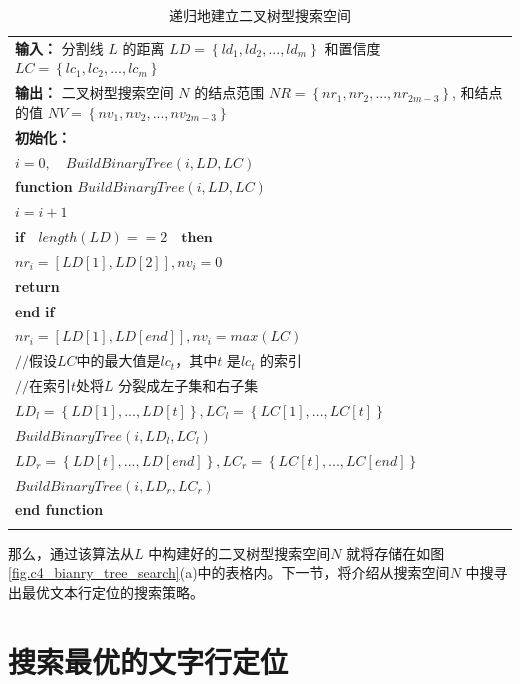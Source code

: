     \begin{table}[!h]
    \renewcommand\arraystretch{1.5}
    \centering
    \caption{递归地建立二叉树型搜索空间}
    \begin{tabular}{p{}}
    \toprule
    \textbf{输入：} 分割线 $L$ 的距离 $LD=\left\{ld_1,ld_2,...,ld_m\right\}$ 和置信度$LC=\left\{lc_1,lc_2,...,lc_m\right\}$\\
    \textbf{输出：} 二叉树型搜索空间 $N$ 的结点范围 $NR=\left\{nr_1,nr_2,...,nr_{2m-3}\right\}$, 和结点的值 $NV=\left\{nv_1,nv_2,...,nv_{2m-3}\right\}$\\
    \midrule
    \textbf{初始化：}\\
    \qquad $i=0, \quad BuildBinaryTree(i,LD,LC)$\\
    \textbf{function} $BuildBinaryTree(i,LD,LC)$\\
    \qquad $i=i+1$ \\
    \qquad $\textbf{if} \quad length(LD)==2 \quad \textbf{then}$ \\
    \qquad \qquad $nr_{i}=[LD[1],LD[2]], nv_{i}=0$ \\
    \qquad \qquad \textbf{return} \\
    \qquad $\textbf{end if}$ \\
    \qquad $nr_{i}=[LD[1],LD[end]], nv_{i}=max(LC)$ \\
    \qquad $//$假设$LC$中的最大值是$lc_t$，其中$t$ 是$lc_t$ 的索引 \\
    \qquad $//$在索引$t$处将$L$ 分裂成左子集和右子集 \\
    \qquad $LD_{l}=\left\{LD[1],...,LD[t]\right\}, LC_{l}=\left\{LC[1],...,LC[t]\right\}$\\
    \qquad $BuildBinaryTree(i,LD_{l},LC_{l})$ \\
    \qquad $LD_{r}=\left\{LD[t],...,LD[end]\right\}, LC_{r}=\left\{LC[t],...,LC[end]\right\}$ \\
    \qquad $BuildBinaryTree(i,LD_{r},LC_{r})$ \\
    \textbf{end function}\\
    \bottomrule
    \label{tab.c4_build_binary_tree}
    \end{tabular}
    \end{table}

    那么，通过该算法从$L$ 中构建好的二叉树型搜索空间$N$ 就将存储在如图\ref{fig.c4_bianry_tree_search}(a)中的表格内。下一节，将介绍从搜索空间$N$ 中搜寻出最优文本行定位的搜索策略。



    \section{搜索最优的文字行定位}

